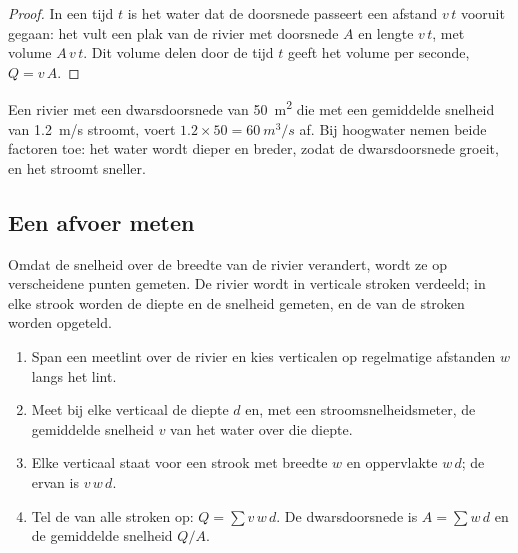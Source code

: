 \begin{proof}
In een tijd $t$ is het water dat de doorsnede passeert een afstand $v\,t$ vooruit
gegaan: het vult een plak van de rivier met doorsnede $A$ en lengte $v\,t$, met
volume $A\,v\,t$. Dit volume delen door de tijd $t$ geeft het volume per
seconde, $Q = v\,A$.
\end{proof}

Een rivier met een dwarsdoorsnede van \qty{50}{m^2} die met een gemiddelde
snelheid van \qty{1.2}{m/s} stroomt, voert $1.2 \times 50 = \qty{60}{m^3/s}$ af.
Bij hoogwater nemen beide factoren toe: het water wordt dieper en breder, zodat
de dwarsdoorsnede groeit, en het stroomt sneller.

\subsection*{Een afvoer meten}

Omdat de snelheid over de breedte van de rivier verandert, wordt ze op
verscheidene punten gemeten. De rivier wordt in verticale stroken verdeeld; in
elke strook worden de diepte en de snelheid gemeten, en de  van de
stroken worden opgeteld.

\begin{method}\label{met:g10:drainage-basins:velocity-area}
\begin{enumerate}
  \item Span een meetlint over de rivier en kies verticalen op regelmatige
        afstanden $w$ langs het lint.
  \item Meet bij elke verticaal de diepte $d$ en, met een stroomsnelheidsmeter,
        de gemiddelde snelheid $v$ van het water over die diepte.
  \item Elke verticaal staat voor een strook met breedte $w$ en oppervlakte
        $w\,d$; de  ervan is $v\,w\,d$.
  \item Tel de  van alle stroken op: $Q = \sum v\,w\,d$.
        De dwarsdoorsnede is $A = \sum w\,d$ en de gemiddelde snelheid $Q/A$.
\end{enumerate}
\end{method}

